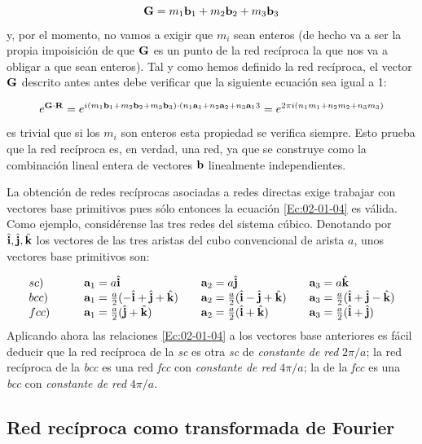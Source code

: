 \begin{equation}
	\mathbf{G} = m_1 \mathbf{b}_1 + m_2 \mathbf{b}_2 + m_3 \mathbf{b}_3
\end{equation}
y, por el momento, no vamos a exigir que $m_i$ sean enteros (de hecho va a ser la propia impoisición de que $\mathbf{G}$ es un punto de la red recíproca la que nos va a obligar a que sean enteros). Tal y como hemos definido la red recíproca, el vector $\mathbf{G}$ descrito antes antes debe verificar que la siguiente ecuación sea igual a 1:

\begin{equation*}
	e^{\mathbf{G}\cdot \mathbf{R}} = e^{i (m_1 \mathbf{b}_1 + m_2 \mathbf{b}_2 +m_3 \mathbf{b}_3)\cdot(n_1 \mathbf{a}_1 +n_2 \mathbf{a}_2 +n_3 \mathbf{a}_13}=e^{2\pi i (n_1m_1+n_2m_2+n_3m_3)}
\end{equation*}
es trivial que si los $m_i$ son enteros esta propiedad se verifica siempre. Esto prueba que la red recíproca es, en verdad, una red, ya que se construye como la combinación lineal entera de vectores $\mathbf{b}$ linealmente independientes. 

La obtención de redes recíprocas asociadas a redes directas exige trabajar con vectores base primitivos pues sólo entonces la ecuación \ref{Ec:02-01-04} es válida. Como ejemplo, considérense las tres redes del sistema cúbico. Denotando por $\hat{\mathbf{i}}, \hat{\mathbf{j}}, \hat{\mathbf{k}}$ los vectores de las tres aristas del cubo convencional de arista $a$, unos vectores base primitivos son:

\begin{equation*}
	\begin{array}{llll}
		sc) \quad &  \quad \mathbf{a}_1 = a \hat{\mathbf{i}} & \quad \mathbf{a}_2 = a \hat{\mathbf{j}} & \quad \mathbf{a}_3 = a \hat{\mathbf{k}} \\
		bcc)  \quad & \quad \mathbf{a}_1 = \frac{a}{2} (-\hat{\mathbf{i}}+\hat{\mathbf{j}}+\hat{\mathbf{k}}) & \quad \mathbf{a}_2 = \frac{a}{2} (\hat{\mathbf{i}}-\hat{\mathbf{j}}+\hat{\mathbf{k}})  & \quad \mathbf{a}_3 = \frac{a}{2} (\hat{\mathbf{i}}+\hat{\mathbf{j}}-\hat{\mathbf{k}})  \\
		fcc) \quad & \quad \mathbf{a}_1 = \frac{a}{2} (\hat{\mathbf{j}} + \hat{\mathbf{k}}) & \quad \mathbf{a}_2 = \frac{a}{2} (\hat{\mathbf{i}} + \hat{\mathbf{k}}) & \quad \mathbf{a}_3 = \frac{a}{2} (\hat{\mathbf{i}} + \hat{\mathbf{j}}) \\
	\end{array}
\end{equation*}
Aplicando ahora las relaciones \ref{Ec:02-01-04} a los vectores base anteriores es fácil deducir que la red recíproca de la \textit{sc} es otra \textit{sc} de \textit{constante de red} $2\pi/a$; la red recíproca de la \textit{bcc} es una red \textit{fcc} con \textit{constante de red} $4\pi/a$; la de la \textit{fcc} es una \textit{bcc} con \textit{constante de red} $4 \pi/a$. 

\subsection{Red recíproca como transformada de Fourier}

